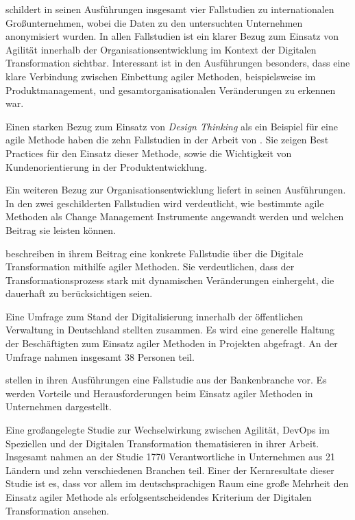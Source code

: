  schildert in seinen Ausführungen insgesamt vier Fallstudien zu internationalen Großunternehmen, wobei die Daten zu den untersuchten Unternehmen anonymisiert wurden. In allen Fallstudien ist ein klarer Bezug zum Einsatz von Agilität innerhalb der Organisationsentwicklung im Kontext der Digitalen Transformation sichtbar. Interessant ist in den Ausführungen besonders, dass eine klare Verbindung zwischen Einbettung agiler Methoden, beispielsweise im Produktmanagement, und gesamtorganisationalen Veränderungen zu erkennen war.

Einen starken Bezug zum Einsatz von \textit{Design Thinking} als ein Beispiel für eine agile Methode haben die zehn Fallstudien in der Arbeit von . Sie zeigen Best Practices  für den Einsatz dieser Methode, sowie die Wichtigkeit von Kundenorientierung in der Produktentwicklung.

Ein weiteren Bezug zur Organisationsentwicklung liefert  in seinen Ausführungen. In den zwei geschilderten Fallstudien wird verdeutlicht, wie bestimmte agile Methoden als Change Management Instrumente angewandt werden und welchen Beitrag sie leisten können.

 beschreiben in ihrem Beitrag eine konkrete Fallstudie über die Digitale Transformation mithilfe agiler Methoden. Sie verdeutlichen, dass der Transformationsprozess stark mit dynamischen Veränderungen einhergeht, die dauerhaft zu berücksichtigen seien.

Eine Umfrage zum Stand der Digitalisierung innerhalb der öffentlichen Verwaltung in Deutschland stellten  zusammen. Es wird eine generelle Haltung der Beschäftigten zum Einsatz agiler Methoden in Projekten abgefragt. An der Umfrage nahmen insgesamt 38 Personen teil.

  stellen in ihren Ausführungen eine Fallstudie aus der Bankenbranche vor. Es werden Vorteile und Herausforderungen beim Einsatz agiler Methoden in Unternehmen dargestellt.

Eine großangelegte Studie zur Wechselwirkung zwischen Agilität, DevOps im Speziellen und der Digitalen Transformation thematisieren  in ihrer Arbeit. Insgesamt nahmen an der Studie 1770 Verantwortliche in Unternehmen aus 21  Ländern und zehn verschiedenen Branchen teil. Einer der Kernresultate dieser Studie ist es, dass vor allem im deutschsprachigen Raum eine große Mehrheit den Einsatz agiler Methode als erfolgsentscheidendes Kriterium der Digitalen Transformation ansehen.

